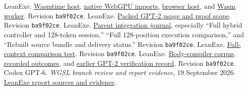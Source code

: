 \documentclass[11pt]{article}
\newcommand{\code}[1]{\texttt{#1}}
\newcommand{\src}[2]{\href{https://github.com/jsmorph/leanexe/blob/ba9f02ce930243a3d35d4d10df6f9c97850ca1e8/#1}{#2}}
\begin{document}
\begin{thebibliography}{16}
 LeanExe.  \src{tools/wasmtime-host.c}{Wasmtime host}, \src{tools/wgsl/gpt2/packed-host.h}{native WebGPU imports}, \src{tools/wgsl/gpt2/packed-browser/host.js}{browser host}, and \src{tools/wgsl/gpt2/packed-browser/worker.js}{Wasm worker}.  Revision \code{ba9f02ce}.
 LeanExe.  \src{docs/wgsl/packed-gpt2.md}{Packed GPT-2 usage and proof scope}.  Revision \code{ba9f02ce}.
 LeanExe.  \src{docs/wgsl/parent-integration-journal.md}{Parent integration journal}, especially ``Full hybrid controller and 128-token session,'' ``Full 128-position execution comparison,'' and ``Rebuilt source bundle and delivery status.''  Revision \code{ba9f02ce}.
 LeanExe.  \src{tools/wgsl/gpt2/packed-session-test.py}{Full-context comparison test}.  Revision \code{ba9f02ce}.
 LeanExe.  \src{tools/wgsl/body-test.js}{Body-compiler corpus}, \src{docs/wgsl/body-compiler.md}{recorded outcomes}, and \src{docs/wgsl/gpt2-verification.md}{earlier GPT-2 verification record}.  Revision \code{ba9f02ce}.
 Codex GPT-6.  \emph{WGSL branch review and report evidence}, 19 September 2026.  \href{https://github.com/jsmorph/leanexe/tree/main/paper/wgsl-verification-report}{LeanExe report sources and evidence}.
\end{thebibliography}
\end{document}

